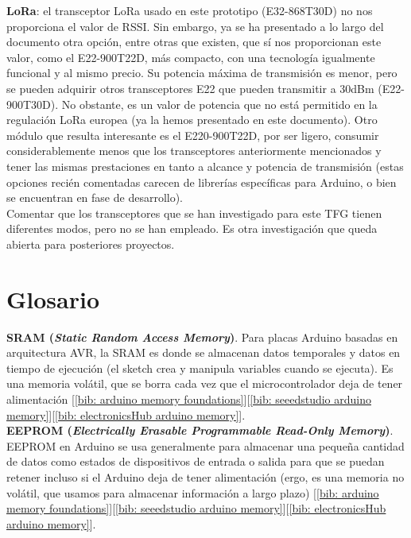 \documentclass[12pt]{article}
\begin{document}
	\noindent \textbf{LoRa}: el transceptor LoRa usado en este prototipo (E32-868T30D) no nos proporciona el valor de RSSI. Sin embargo, ya se ha presentado a lo largo del documento otra opción, entre otras que existen, que sí nos proporcionan este valor, como el E22-900T22D, más compacto, con una tecnología igualmente funcional y al mismo precio. Su potencia máxima de transmisión es menor, pero se pueden adquirir otros transceptores E22 que pueden transmitir a 30dBm (E22-900T30D). No obstante, es un valor de potencia que no está permitido en la regulación LoRa europea (ya la hemos presentado en este documento). Otro módulo que resulta interesante es el E220-900T22D, por ser ligero, consumir considerablemente menos que los transceptores anteriormente mencionados y tener las mismas prestaciones en tanto a alcance y potencia de transmisión (estas opciones recién comentadas carecen de librerías específicas para Arduino, o bien se encuentran en fase de desarrollo).\\
	
	\noindent Comentar que los transceptores que se han investigado para este TFG tienen diferentes modos, pero no se han empleado. Es otra investigación que queda abierta para posteriores proyectos. \\
	
	
	\pagebreak
	
	\section*{Glosario}
	\label{glosario}
	
	\noindent \textbf{\large SRAM (\textit{Static Random Access Memory})}. Para placas Arduino basadas en arquitectura AVR, la SRAM es donde se almacenan datos temporales y datos en tiempo de ejecución (el sketch crea y manipula variables cuando se ejecuta). Es una memoria volátil, que se borra cada vez que el microcontrolador deja de tener alimentación [\ref{bib: arduino memory foundations}][\ref{bib: seeedstudio arduino memory}][\ref{bib: electronicsHub arduino memory}].\\
	
	\noindent \textbf{\large EEPROM (\textit{Electrically Erasable Programmable Read-Only Memory})}. EEPROM en Arduino se usa generalmente para almacenar una pequeña cantidad de datos como estados de dispositivos de entrada o salida para que se puedan retener incluso si el Arduino deja de tener alimentación (ergo, es una memoria no volátil, que usamos para almacenar información a largo plazo) [\ref{bib: arduino memory foundations}][\ref{bib: seeedstudio arduino memory}][\ref{bib: electronicsHub arduino memory}].  \\
	
\end{document}
